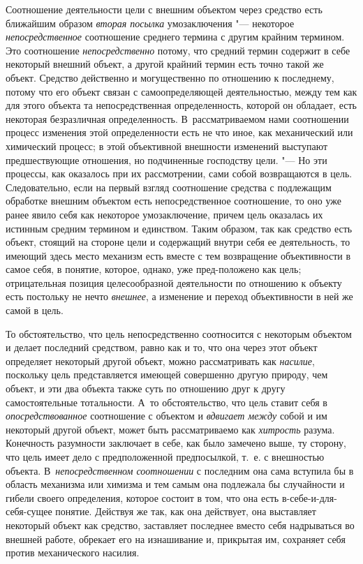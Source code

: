 Соотношение деятельности цели с внешним объектом через
средство есть ближайшим образом
{\em вторая посылка}
умозаключения "--- некоторое
{\em непосредственное}
соотношение среднего термина с другим крайним термином. Это
соотношение {\em непосредственно}
потому, что средний термин содержит в себе некоторый внешний
объект, а другой крайний термин есть точно такой же объект. Средство
действенно и могущественно по отношению к последнему, потому что его объект
связан с самоопределяющей деятельностью, между тем как для этого объекта та
непосредственная определенность, которой он обладает, есть некоторая
безразличная определенность. В~рассматриваемом нами соотношении процесс
изменения этой определенности есть не что иное, как механический или
химический процесс; в этой объективной внешности изменений выступают
предшествующие отношения, но подчиненные господству цели. "---
Но эти процессы, как оказалось при их рассмотрении, сами
собой возвращаются в цель. Следовательно, если на первый взгляд соотношение
средства с подлежащим обработке внешним объектом есть непосредственное
соотношение, то оно уже ранее явило себя как некоторое умозаключение,
причем цель оказалась их истинным средним термином и единством. Таким
образом, так как средство есть объект, стоящий на стороне цели и содержащий
внутри себя ее деятельность, то имеющий здесь место механизм есть вместе с
тем возвращение объективности в самое себя, в понятие, которое, однако, уже
пред-положено как цель; отрицательная позиция целесообразной деятельности
по отношению к объекту есть постольку не нечто
{\em внешнее}, а
изменение и переход объективности в ней же самой в цель.

То обстоятельство, что цель непосредственно соотносится с
некоторым объектом и делает последний средством, равно как и то, что она
через этот объект определяет некоторый другой объект, можно рассматривать
как {\em насилие},
поскольку цель представляется имеющей совершенно другую
природу, чем объект, и эти два объекта также суть по отношению друг к другу
самостоятельные тотальности. А~то обстоятельство, что цель ставит себя в
{\em опосредствованное}
соотношение с объектом и
{\em вдвигает между}
собой и им некоторый другой объект, может быть рассматриваемо
как {\em хитрость}
разума. Конечность разумности заключает в себе, как было
замечено выше, ту сторону, что цель имеет дело с
предположенной предпосылкой, т.~е. с внешностью объекта.
В~{\em непосредственном соотношении}
с последним она сама вступила бы в область механизма или
химизма и тем самым она подлежала бы случайности и гибели своего
определения, которое состоит в том, что она есть в-себе-и-для-себя-сущее
понятие. Действуя же так, как она действует, она выставляет некоторый
объект как средство, заставляет последнее вместо себя надрываться во
внешней работе, обрекает его на изнашивание и, прикрытая им, сохраняет себя
против механического насилия.

